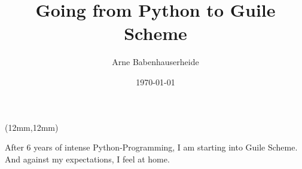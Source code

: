 \documentclass[a5paper]{memoir}
\author{Arne Babenhauserheide}
\date{\today}
\title{Going from Python to Guile Scheme}
\renewenvironment{abstract}{%
\hfill\begin{textblock*}{100mm}(12mm,12mm)
\noindent%
\noindent \huge \begin{displayquote}}
{\end{displayquote}\par\noindent%
\end{textblock*}}
\begin{document}
\maketitle
{}
\begin{abstract}
After 6 years of intense Python-Programming, I am starting into Guile Scheme. And against my expectations, I feel at home.
\end{abstract}

\newpage
\end{document}
